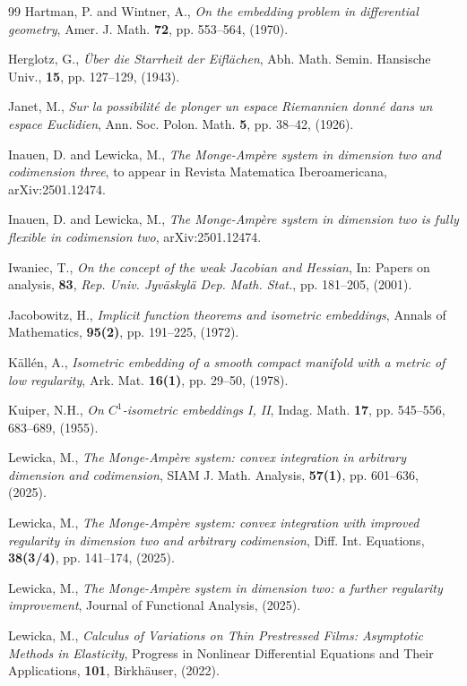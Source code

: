 \documentclass[reqno,twoside,11pt]{amsart}
\numberwithin{equation}{section}
\theoremstyle{plain}
\theoremstyle{definition}
\begin{document}
\begin{thebibliography}{99}
 {\sc Hartman, P. and Wintner, A.}, {\em On the
    embedding problem in differential geometry},  Amer. J. Math. {\bf
    72}, pp. 553--564, (1970).

 {\sc Herglotz, G.}, {\em \"Uber die Starrheit der
    Eifl\"achen}, Abh. Math. Semin. Hansische Univ.,
{\bf 15}, pp. 127--129, (1943).

 {\sc Janet, M.}, {\em Sur la possibilit\'e de plonger
    un espace Riemannien donn\'e dans un  espace Euclidien},
  Ann. Soc. Polon. Math. {\bf 5}, pp. 38--42, (1926).

 {\sc Inauen, D. and Lewicka, M.},
{\em The Monge-Amp\`ere system in dimension two and codimension
  three}, to appear in Revista Matematica Iberoamericana, arXiv:2501.12474.

 {\sc Inauen, D. and Lewicka, M.},
{\em The Monge-Amp\`ere system in dimension two is fully flexible in
  codimension two}, arXiv:2501.12474.

 {\sc Iwaniec, T.},
{\em On the concept of the weak {J}acobian and {H}essian}, In: Papers
on analysis, {\bf 83}, {\em Rep. Univ. Jyv\"askyl\"a
  Dep. Math. Stat.}, pp. 181--205, (2001).

 {\sc Jacobowitz, H.}, {\em Implicit function theorems and isometric embeddings},
Annals of Mathematics, {\bf 95(2)}, pp. 191--225, (1972).

 {\sc K\"all\'en, A.},
{\em Isometric embedding of a smooth compact manifold with a metric of
  low regularity}, Ark. Mat. {\bf 16(1)}, pp. 29--50, (1978).

 {\sc Kuiper, N.H.}, {\em On $C^1$-isometric
    embeddings I, II}, Indag. Math. {\bf 17}, pp. 545--556, 683--689, (1955).

 {\sc Lewicka, M.},
{\em The Monge-Amp\`ere system: convex integration in arbitrary
  dimension and codimension}, SIAM J. Math. Analysis, {\bf 57(1)}, pp. 601--636, (2025).

 {\sc Lewicka, M.},
{\em The Monge-Amp\`ere system: convex integration with
  improved regularity in dimension two and arbitrary codimension}, Diff.
Int. Equations, {\bf 38(3/4)}, pp. 141--174, (2025).

 {\sc Lewicka, M.},
{\em The Monge-Amp\`ere system in dimension two: a further regularity
  improvement}, Journal of Functional Analysis, (2025).

 {\sc Lewicka, M.},
{\em Calculus of Variations on Thin Prestressed Films: Asymptotic
  Methods in Elasticity}, Progress in Nonlinear Differential Equations
and Their Applications, {\bf 101}, Birkh\"auser, (2022). 


\end{thebibliography}
\end{document}
